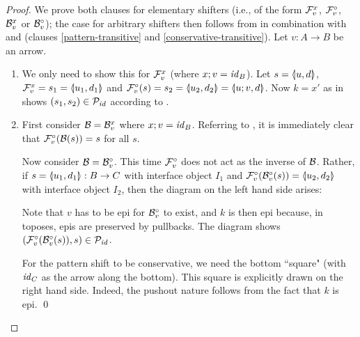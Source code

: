 %
\begin{proof}
We prove both clauses for elementary shifters (i.e., of the form $\rF v x$, $\dF v$, $\rB v x$ or $\dB v$); the case for arbitrary shifters then follows from  in combination with  and  (clauses \ref{pattern-transitive} and \ref{conservative-transitive}). Let $v:A\to B$ be an arrow.
\begin{enumerate}[topsep=\smallskipamount]
\item We only need to show this for $\rF v x$ (where $x;v=\id_B$). Let $s=\spanof u d$, $\rF v x=s_1=\spanof{u_1}{d_1}$ and $\dF v(s)=s_2=\spanof{u_2}{d_2}=\spanof{u;v}{d}$. Now $k=x'$ as in  shows $(s_1,s_2)\in \cP_\id$ according to .

\item First consider $\cB=\rB v x$ where $x;v=\id_B$. Referring to , it is immediately clear that $\dF v(\cB(s))=s$ for all $s$.

Now consider $\cB=\dB v$. This time $\dF v$ does not act as the inverse of $\cB$. Rather, if $s=\spanof{u_1}{d_1}:B\to C$ with interface object $I_1$ and $\dF v(\dB v(s))=\spanof{u_2}{d_2}$ with interface object $I_2$, then the diagram on the left hand side arises:
\begin{center}
\qquad
{}
\end{center}
Note that $v$ has to be epi for $\dB v$ to exist, and $k$ is then epi because, in toposes, epis are preserved by pullbacks. The diagram shows $(\dF v(\dB v(s)),s)\in \cP_\id$.

For the pattern shift to be conservative, we need the bottom ``square" (with $\id_C$ as the arrow along the bottom). This square is explicitly drawn on the right hand side. Indeed, the pushout nature follows from the fact that $k$ is epi.
\qed
\end{enumerate}
\end{proof}
